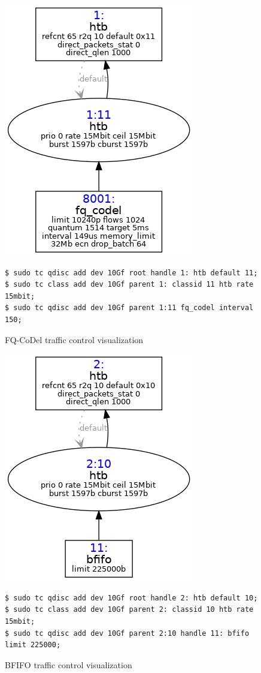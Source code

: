 \documentclass[a4paper,english, 12pt]{report}
\begin{document}
\begin{figure}[h!] %
	\centering
	\includegraphics[scale=0.60]{../diagrams/tc/tc_base_fq.png}
  	\begin{verbatim}
$ sudo tc qdisc add dev 10Gf root handle 1: htb default 11;
$ sudo tc class add dev 10Gf parent 1: classid 11 htb rate 15mbit;
$ sudo tc qdisc add dev 10Gf parent 1:11 fq_codel interval 150;
	\end{verbatim}
	\caption{FQ-CoDel traffic control visualization}
  	\label{fig:tc_base_fq}
\end{figure}


\begin{figure}[h!] %
	\centering
	\includegraphics[scale=0.60]{../diagrams/tc/tc_base_bfifo.png}
	\begin{verbatim}
$ sudo tc qdisc add dev 10Gf root handle 2: htb default 10;
$ sudo tc class add dev 10Gf parent 2: classid 10 htb rate 15mbit;
$ sudo tc qdisc add dev 10Gf parent 2:10 handle 11: bfifo limit 225000;
\end{verbatim}
  	\caption{BFIFO traffic control visualization}
  	\label{fig:tc_base_bfifo}
\end{figure}
\end{document}
